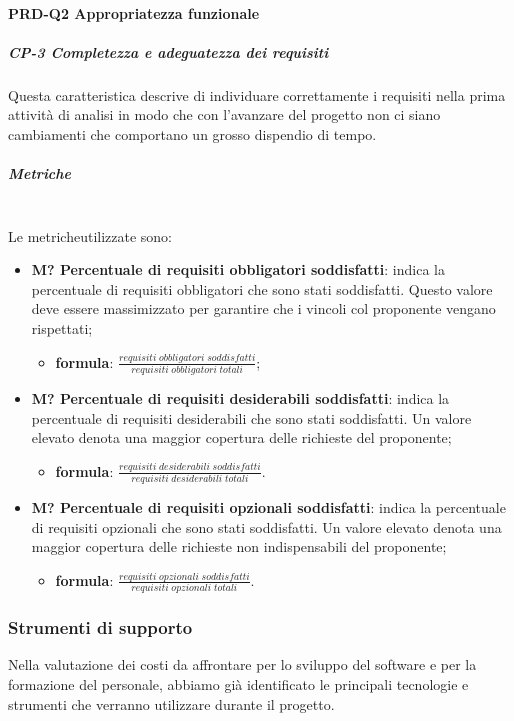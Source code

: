 		\paragraph{PRD-Q2 Appropriatezza funzionale}
		\subparagraph{CP-3 Completezza e adeguatezza dei requisiti}
		Questa caratteristica descrive di individuare correttamente i requisiti nella prima attività di analisi in modo che con l'avanzare del progetto non ci siano cambiamenti che comportano un grosso dispendio di tempo.
		\subparagraph{Metriche}\mbox{}\\ [1mm]
		Le metriche\glosp utilizzate sono:
			\begin{itemize}
				\item \textbf{M? Percentuale di requisiti obbligatori soddisfatti}: indica la percentuale di requisiti obbligatori che sono stati soddisfatti. Questo valore deve essere massimizzato per garantire che i vincoli col proponente vengano rispettati;
				\begin{itemize}
					\item[] \textbf{formula}: $\frac{requisiti \; obbligatori \; soddisfatti}{requisiti \; obbligatori \; totali}$;
				\end{itemize} 
				\item \textbf{M? Percentuale di requisiti desiderabili soddisfatti}:
				indica la percentuale di requisiti desiderabili che sono stati soddisfatti. Un valore elevato denota una maggior copertura delle richieste del proponente;
				\begin{itemize}
					\item[] \textbf{formula}: $\frac{requisiti \; desiderabili \; soddisfatti}{requisiti \; desiderabili \; totali}$.
				\end{itemize} 
				\item \textbf{M? Percentuale di requisiti opzionali soddisfatti}:
				indica la percentuale di requisiti opzionali che sono stati soddisfatti. Un valore elevato denota una maggior copertura delle richieste non indispensabili  del proponente;
				\begin{itemize}
					\item[] \textbf{formula}: $\frac{requisiti \; opzionali \; soddisfatti}{requisiti \; opzionali \; totali}$.
				\end{itemize} 
			\end{itemize}
		
		\subsubsection{Strumenti di supporto}
		Nella valutazione dei costi da affrontare per lo sviluppo del software e per la formazione del personale, abbiamo già identificato le principali tecnologie e strumenti che verranno utilizzare durante il progetto\glo.
